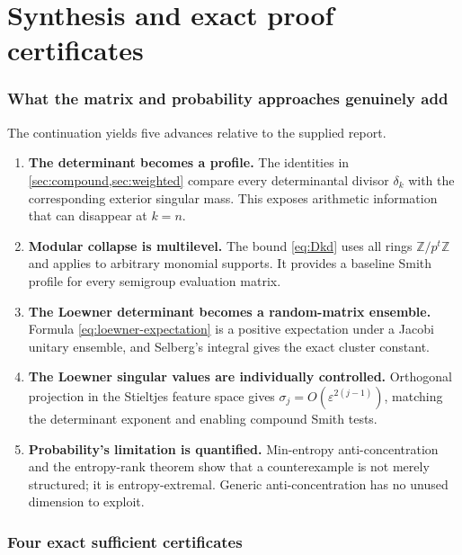 \documentclass[11pt,oneside]{article}
\theoremstyle{definition}
\theoremstyle{remark}
\newcommand{\Z}{\mathbb{Z}}
\newcommand{\eps}{\varepsilon}
\begin{document}
\part{Synthesis and exact proof certificates}

\section{What the matrix and probability approaches genuinely add}
\label{sec:synthesis}

The continuation yields five advances relative to the supplied report.

\begin{enumerate}
\item \textbf{The determinant becomes a profile.}  The identities in \cref{sec:compound,sec:weighted} compare every determinantal divisor $\delta_k$ with the corresponding exterior singular mass.  This exposes arithmetic information that can disappear at $k=n$.

\item \textbf{Modular collapse is multilevel.}  The bound \eqref{eq:Dkd} uses all rings $\Z/p^t\Z$ and applies to arbitrary monomial supports.  It provides a baseline Smith profile for every semigroup evaluation matrix.

\item \textbf{The Loewner determinant becomes a random-matrix ensemble.}  Formula \eqref{eq:loewner-expectation} is a positive expectation under a Jacobi unitary ensemble, and Selberg's integral gives the exact cluster constant.

\item \textbf{The Loewner singular values are individually controlled.}  Orthogonal projection in the Stieltjes feature space gives $\sigma_j=O(\eps^{2(j-1)})$, matching the determinant exponent and enabling compound Smith tests.

\item \textbf{Probability's limitation is quantified.}  Min-entropy anti-concentration and the entropy-rank theorem show that a counterexample is not merely structured; it is entropy-extremal.  Generic anti-concentration has no unused dimension to exploit.
\end{enumerate}

\section{Four exact sufficient certificates}
\label{sec:certificates}
\end{document}
